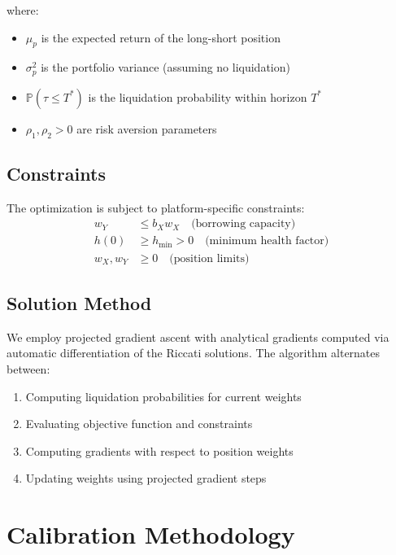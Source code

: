 \documentclass{article}
\renewcommand{\P}{\mathbb{P}}
\theoremstyle{definition}
\begin{document}
where:
\begin{itemize}
    \item $\mu_p$ is the expected return of the long-short position
    \item $\sigma_p^2$ is the portfolio variance (assuming no liquidation)
    \item $\P(\tau \leq T^*)$ is the liquidation probability within horizon $T^*$
    \item $\rho_1, \rho_2 > 0$ are risk aversion parameters
\end{itemize}

\subsection{Constraints}

The optimization is subject to platform-specific constraints:
\begin{align}
w_Y &\leq b_X w_X \quad \text{(borrowing capacity)} \\
h(0) &\geq h_{\min} > 0 \quad \text{(minimum health factor)} \\
w_X, w_Y &\geq 0 \quad \text{(position limits)}
\end{align}

\subsection{Solution Method}

We employ projected gradient ascent with analytical gradients computed via automatic differentiation of the Riccati solutions. The algorithm alternates between:
\begin{enumerate}
    \item Computing liquidation probabilities for current weights
    \item Evaluating objective function and constraints
    \item Computing gradients with respect to position weights
    \item Updating weights using projected gradient steps
\end{enumerate}

\section{Calibration Methodology}
\end{document}
